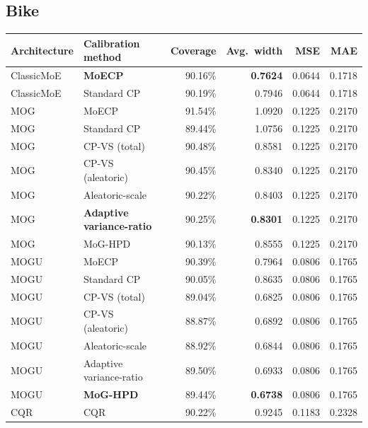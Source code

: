 \documentclass[11pt]{article}
\begin{document}
\subsection{Bike}
\begin{center}
\begin{tabular}{@{}llrrrr@{}}
\toprule
\textbf{Architecture} & \textbf{Calibration method} & \textbf{Coverage} & \textbf{Avg.\ width} &
\textbf{MSE} & \textbf{MAE} \\
\midrule
ClassicMoE & \textbf{MoECP}     & 90.16\% & \textbf{0.7624} & 0.0644 & 0.1718 \\
ClassicMoE & Standard CP        & 90.19\% & 0.7946 & 0.0644 & 0.1718 \\
\midrule
MOG & MoECP                     & 91.54\% & 1.0920 & 0.1225 & 0.2170 \\
MOG & Standard CP               & 89.44\% & 1.0756 & 0.1225 & 0.2170 \\
MOG & CP-VS (total)             & 90.48\% & 0.8581 & 0.1225 & 0.2170 \\
MOG & CP-VS (aleatoric)         & 90.45\% & 0.8340 & 0.1225 & 0.2170 \\
MOG & Aleatoric-scale           & 90.22\% & 0.8403 & 0.1225 & 0.2170 \\
MOG & \textbf{Adaptive variance-ratio} & 90.25\% & \textbf{0.8301} & 0.1225 & 0.2170 \\
MOG & MoG-HPD                   & 90.13\% & 0.8555 & 0.1225 & 0.2170 \\
\midrule
MOGU & MoECP                    & 90.39\% & 0.7964 & 0.0806 & 0.1765 \\
MOGU & Standard CP              & 90.05\% & 0.8635 & 0.0806 & 0.1765 \\
MOGU & CP-VS (total)            & 89.04\% & 0.6825 & 0.0806 & 0.1765 \\
MOGU & CP-VS (aleatoric)        & 88.87\% & 0.6892 & 0.0806 & 0.1765 \\
MOGU & Aleatoric-scale          & 88.92\% & 0.6844 & 0.0806 & 0.1765 \\
MOGU & Adaptive variance-ratio  & 89.50\% & 0.6933 & 0.0806 & 0.1765 \\
MOGU & \textbf{MoG-HPD}         & 89.44\% & \textbf{0.6738} & 0.0806 & 0.1765 \\
\midrule
CQR & CQR                       & 90.22\% & 0.9245 & 0.1183 & 0.2328 \\
\bottomrule
\end{tabular}
\end{center}
\end{document}
